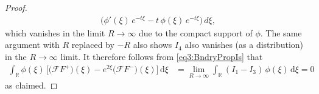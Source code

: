 \documentclass[../dissertation.tex]{subfiles}
\begin{document}
\begin{proof}
\begin{align}
					\big(
						\phi'(\xi) \, e^{-t\xi} - t \,\phi(\xi)\, e^{-t\xi}
					\big)
				\,d\xi,
	\end{align}
	which vanishes in the limit $R\to \infty$ due to the compact support of $\phi$.
	The same argument with $R$ replaced by $-R$ also shows $I_4$ also vanishes 
	(as a distribution) in the $R\to\infty$ limit. It therefore follows
	from \eqref{eq3:BndryPropIs} that 
	\begin{align*}
		\int_{\mathbb R} 
			\phi(\xi) \, 
			\Big[ 
				\big(\mathcal F F^+\big)(\xi) - e^{2\xi}\big(\mathcal F F^-\big)(\xi) 
			\Big]
			\, \mathrm{d}\xi
		&= \lim_{R\to\infty} \int_{\mathbb R} (I_1-I_3) \, \phi(\xi) \, \mathrm{d}\xi
		=0
	\end{align*}
	as claimed.
\end{proof}
\end{document}
